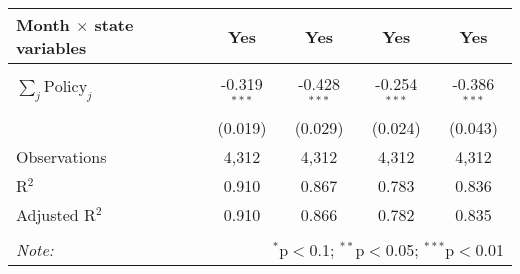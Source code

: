\begin{tabular}{@{\extracolsep{1pt}}lcccc}
Month $\times$ state variables & Yes & Yes & Yes & Yes \\ 
\hline \\[-1.8ex] 
$\sum_j \mathrm{Policy}_j$ & -0.319$^{***}$ & -0.428$^{***}$ & -0.254$^{***}$ & -0.386$^{***}$ \\ 
 & (0.019) & (0.029) & (0.024) & (0.043) \\ 
Observations & 4,312 & 4,312 & 4,312 & 4,312 \\ 
R$^{2}$ & 0.910 & 0.867 & 0.783 & 0.836 \\ 
Adjusted R$^{2}$ & 0.910 & 0.866 & 0.782 & 0.835 \\ 
\hline 
\hline \\[-1.8ex] 
\textit{Note:}  & \multicolumn{4}{r}{$^{*}$p$<$0.1; $^{**}$p$<$0.05; $^{***}$p$<$0.01} \\ 
\end{tabular} 